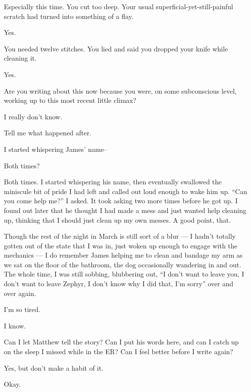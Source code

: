 \begin{paracol}{2}
\begin{leftcolumn}
\begin{ally}
Especially this time. You cut too deep. Your usual superficial-yet-still-painful scratch had turned into something of a flay.
\end{ally}
Yes.

\begin{ally}
You needed twelve stitches. You lied and said you dropped your knife while cleaning it.
\end{ally}
Yes.

\begin{ally}
Are you writing about this now because you were, on some subconscious level, working up to this most recent little climax?
\end{ally}
I really don't know.

\begin{ally}
Tell me what happened after.
\end{ally}
I started whispering James' name--

\begin{ally}
Both times?
\end{ally}
Both times. I started whispering his name, then eventually swallowed the miniscule bit of pride I had left and called out loud enough to wake him up. ``Can you come help me?'' I asked. It took asking two more times before he got up. I found out later that he thought I had made a mess and just wanted help cleaning up, thinking that I should just clean up my own messes. A good point, that.

Though the rest of the night in March is still sort of a blur --- I hadn't totally gotten out of the state that I was in, just woken up enough to engage with the mechanics --- I do remember James helping me to clean and bandage my arm as we sat on the floor of the bathroom, the dog occasionally wandering in and out. The whole time, I was still sobbing, blubbering out, ``I don't want to leave you, I don't want to leave Zephyr, I don't know why I did that, I'm sorry'' over and over again.
\newpage

\noindent I'm so tired.

\begin{ally}
I know.
\end{ally}
Can I let Matthew tell the story? Can I put his words here, and can I catch up on the sleep I missed while in the ER? Can I feel better before I write again?

\begin{ally}
Yes, but don't make a habit of it.
\end{ally}
Okay.


\end{leftcolumn}
\end{paracol}
